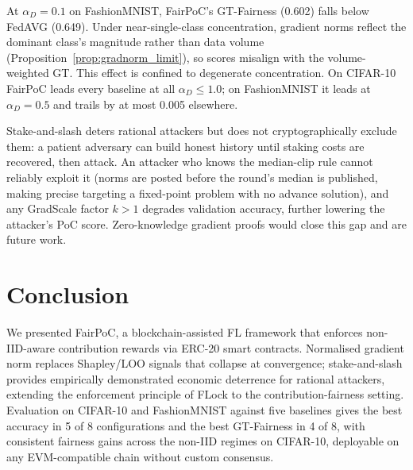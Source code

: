 \documentclass[conference]{IEEEtran}
\theoremstyle{remark}
\begin{document}
At $\alpha_D = 0.1$ on FashionMNIST, FairPoC's GT-Fairness (0.602)
falls below FedAVG (0.649). Under near-single-class concentration,
gradient norms reflect the dominant class's magnitude rather than data
volume (Proposition~\ref{prop:gradnorm_limit}), so scores misalign with
the volume-weighted GT. This effect is confined to degenerate
concentration. On CIFAR-10 FairPoC leads every baseline at all
$\alpha_D \leq 1.0$; on FashionMNIST it leads at $\alpha_D = 0.5$ and trails
by at most 0.005 elsewhere.

Stake-and-slash deters rational attackers but does not cryptographically
exclude them: a patient adversary can build honest history until staking
costs are recovered, then attack. An attacker who knows the median-clip
rule cannot reliably exploit it (norms are posted before the round's
median is published, making precise targeting a fixed-point problem with
no advance solution), and any GradScale factor $k{>}1$ degrades
validation accuracy, further lowering the attacker's PoC score.
Zero-knowledge gradient proofs would close this gap and are future work.

\section{Conclusion}

We presented FairPoC, a blockchain-assisted FL framework that enforces
non-IID-aware contribution rewards via ERC-20 smart contracts.
Normalised gradient norm replaces Shapley/LOO signals that collapse at
convergence; stake-and-slash provides empirically demonstrated economic deterrence for
rational attackers, extending the enforcement principle of FLock to the
contribution-fairness setting. Evaluation on CIFAR-10 and FashionMNIST against five baselines
gives the best accuracy in 5 of 8 configurations and the best
GT-Fairness in 4 of 8, with consistent fairness gains across the
non-IID regimes on CIFAR-10, deployable on any EVM-compatible chain
without custom consensus.



\end{document}
